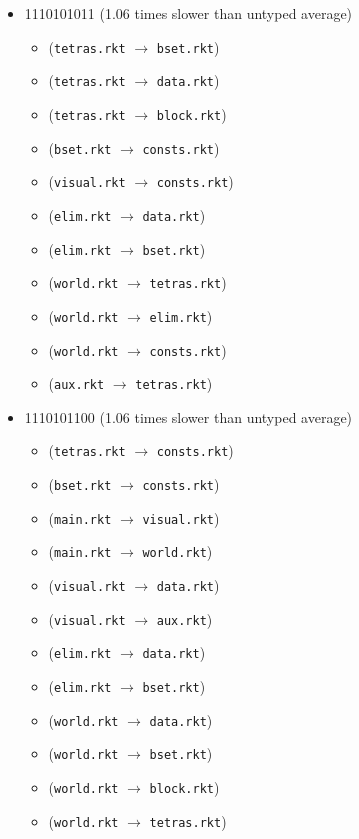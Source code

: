 \documentclass{article}
\newcommand{\mono}[1]{\texttt{#1}}
\begin{document}
\begin{itemize}
\begin{itemize}
  \end{itemize}
\item 1110101011 (1.06 times slower than untyped average)
  \begin{itemize}
  \item (\mono{tetras.rkt} $\rightarrow$ \mono{bset.rkt})
  \item (\mono{tetras.rkt} $\rightarrow$ \mono{data.rkt})
  \item (\mono{tetras.rkt} $\rightarrow$ \mono{block.rkt})
  \item (\mono{bset.rkt} $\rightarrow$ \mono{consts.rkt})
  \item (\mono{visual.rkt} $\rightarrow$ \mono{consts.rkt})
  \item (\mono{elim.rkt} $\rightarrow$ \mono{data.rkt})
  \item (\mono{elim.rkt} $\rightarrow$ \mono{bset.rkt})
  \item (\mono{world.rkt} $\rightarrow$ \mono{tetras.rkt})
  \item (\mono{world.rkt} $\rightarrow$ \mono{elim.rkt})
  \item (\mono{world.rkt} $\rightarrow$ \mono{consts.rkt})
  \item (\mono{aux.rkt} $\rightarrow$ \mono{tetras.rkt})
  \end{itemize}
\item 1110101100 (1.06 times slower than untyped average)
  \begin{itemize}
  \item (\mono{tetras.rkt} $\rightarrow$ \mono{consts.rkt})
  \item (\mono{bset.rkt} $\rightarrow$ \mono{consts.rkt})
  \item (\mono{main.rkt} $\rightarrow$ \mono{visual.rkt})
  \item (\mono{main.rkt} $\rightarrow$ \mono{world.rkt})
  \item (\mono{visual.rkt} $\rightarrow$ \mono{data.rkt})
  \item (\mono{visual.rkt} $\rightarrow$ \mono{aux.rkt})
  \item (\mono{elim.rkt} $\rightarrow$ \mono{data.rkt})
  \item (\mono{elim.rkt} $\rightarrow$ \mono{bset.rkt})
  \item (\mono{world.rkt} $\rightarrow$ \mono{data.rkt})
  \item (\mono{world.rkt} $\rightarrow$ \mono{bset.rkt})
  \item (\mono{world.rkt} $\rightarrow$ \mono{block.rkt})
  \item (\mono{world.rkt} $\rightarrow$ \mono{tetras.rkt})

\end{itemize}
\end{itemize}
\end{document}

